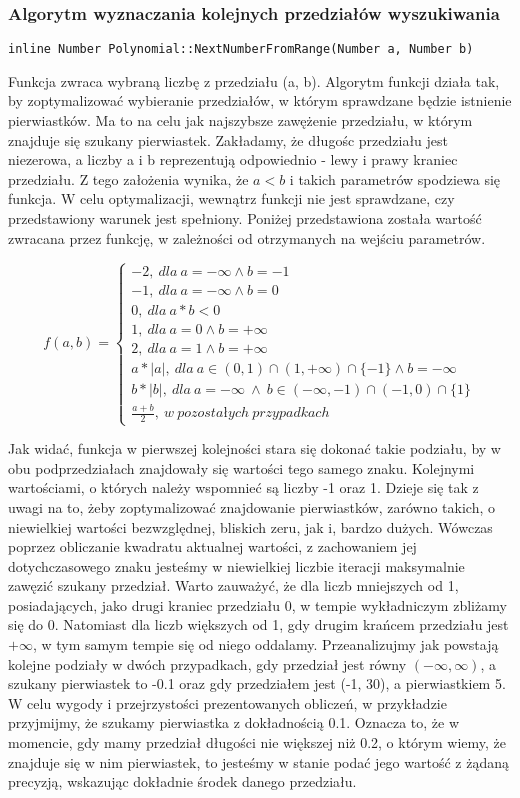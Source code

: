 \documentclass[twoside,a4paper]{book}
\begin{document}
\subsubsection{Algorytm wyznaczania kolejnych przedziałów wyszukiwania}
\begin{lstlisting}
inline Number Polynomial::NextNumberFromRange(Number a, Number b)
\end{lstlisting}

Funkcja zwraca wybraną liczbę z przedziału (a, b). Algorytm funkcji działa tak, by zoptymalizować wybieranie przedziałów, w którym sprawdzane będzie istnienie pierwiastków. Ma to na celu jak najszybsze zawężenie przedziału, w którym znajduje się szukany pierwiastek. Zakładamy, że długośc przedziału jest niezerowa, a liczby a i b reprezentują odpowiednio - lewy i prawy kraniec przedziału. Z tego założenia wynika, że $a<b$ i takich parametrów spodziewa się funkcja. W celu optymalizacji, wewnątrz funkcji nie jest sprawdzane, czy przedstawiony warunek jest spełniony. Poniżej przedstawiona została wartość zwracana przez funkcję, w zależności od otrzymanych na wejściu parametrów.

\[
f(a,b)=\left\{
\begin{array}{ll}
-2,\ dla\ a=-\infty \wedge b=-1\\
-1,\ dla\ a=-\infty \wedge b=0\\
0,\ dla\ a*b<0\\
1,\ dla\ a=0 \wedge b=+\infty\\
2,\ dla\ a=1 \wedge b=+\infty\\
a*|a|,\ dla\ a \in (0,1) \cap (1,+\infty) \cap \{-1\} \wedge b=-\infty\ \\
b*|b|,\ dla\ a=-\infty\ \wedge \ b \in (-\infty,-1) \cap (-1,0) \cap \{1\}\\
\frac{a+b}{2},\ w\ pozostałych\ przypadkach
\end{array}
\right.
\]

Jak widać, funkcja w pierwszej kolejności stara się dokonać takie podziału, by w obu podprzedziałach znajdowały się wartości tego samego znaku. Kolejnymi wartościami, o których należy wspomnieć są liczby -1 oraz 1. Dzieje się tak z uwagi na to, żeby zoptymalizować znajdowanie pierwiastków, zarówno takich, o niewielkiej wartości bezwzględnej, bliskich zeru, jak i, bardzo dużych. Wówczas poprzez obliczanie kwadratu aktualnej wartości, z zachowaniem jej dotychczasowego znaku jesteśmy w niewielkiej liczbie iteracji maksymalnie zawęzić szukany przedział. Warto zauważyć, że dla liczb mniejszych od 1, posiadających, jako drugi kraniec przedziału 0, w tempie wykładniczym zbliżamy się do 0. Natomiast dla liczb większych od 1, gdy drugim krańcem przedziału jest $+\infty$, w tym samym tempie się od niego oddalamy. Przeanalizujmy jak powstają kolejne podziały w dwóch przypadkach, gdy przedział jest równy $(-\infty,\infty)$, a szukany pierwiastek to -0.1 oraz gdy przedziałem jest (-1, 30), a pierwiastkiem 5. W celu wygody i przejrzystości prezentowanych obliczeń, w przykładzie przyjmijmy, że szukamy pierwiastka z dokładnością 0.1. Oznacza to, że w momencie, gdy mamy przedział długości nie większej niż 0.2, o którym wiemy, że znajduje się w nim pierwiastek, to jesteśmy w stanie podać jego wartość z żądaną precyzją, wskazując dokładnie środek danego przedziału.
\end{document}
